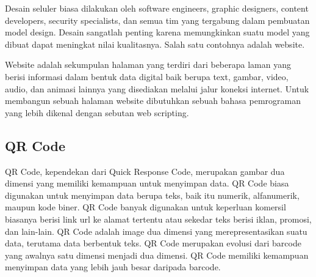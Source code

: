 Desain seluler biasa dilakukan oleh software engineers, graphic designers, content developers, security specialists, dan semua tim yang tergabung dalam pembuatan model design. Desain sangatlah penting karena memungkinkan suatu model yang dibuat dapat meningkat nilai kualitasnya. Salah satu contohnya adalah website. 

Website adalah sekumpulan halaman yang terdiri dari beberapa laman yang berisi informasi dalam bentuk data digital baik berupa text, gambar, video, audio, dan animasi lainnya yang disediakan melalui jalur koneksi internet. Untuk membangun sebuah halaman website dibutuhkan sebuah bahasa pemrograman yang lebih dikenal dengan sebutan web scripting. 

\cite{pressman2019software}

\subsection{QR Code}
QR Code, kependekan dari Quick Response Code, merupakan gambar dua dimensi yang memiliki kemampuan untuk menyimpan data. QR Code biasa digunakan untuk menyimpan data berupa teks, baik itu numerik, alfanumerik, maupun kode biner. QR Code banyak digunakan untuk keperluan komersil biasanya berisi link url ke alamat tertentu atau sekedar teks berisi iklan, promosi, dan lain-lain. QR Code adalah image dua dimensi yang merepresentasikan
suatu data, terutama data berbentuk teks. QR Code merupakan evolusi dari barcode yang awalnya satu dimensi menjadi dua dimensi. QR Code memiliki kemampuan menyimpan data yang
lebih jauh besar daripada barcode.